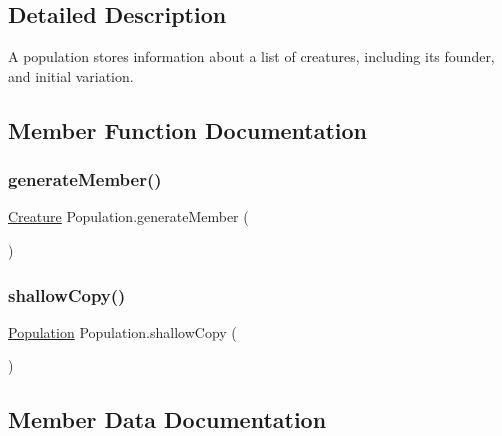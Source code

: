 \subsection{Detailed Description}
A population stores information about a list of creatures, including it\textquotesingle{}s founder, and initial variation. 



\subsection{Member Function Documentation}
\mbox{\label{class_population_a72997a708270ddf7ae76faff9a97190e}} 
\subsubsection{\texorpdfstring{generate\+Member()}{generateMember()}}
{\footnotesize\ttfamily \mbox{\hyperlink{class_creature}{Creature}} Population.\+generate\+Member (\begin{DoxyParamCaption}{ }\end{DoxyParamCaption})}

\mbox{\label{class_population_a910060609bb65d002204b871df9a6876}} 
\subsubsection{\texorpdfstring{shallow\+Copy()}{shallowCopy()}}
{\footnotesize\ttfamily \mbox{\hyperlink{class_population}{Population}} Population.\+shallow\+Copy (\begin{DoxyParamCaption}{ }\end{DoxyParamCaption})}



\subsection{Member Data Documentation}
\mbox{\label{class_population_a84fda8156e0f5cf7a90178f879d070b0}} 
